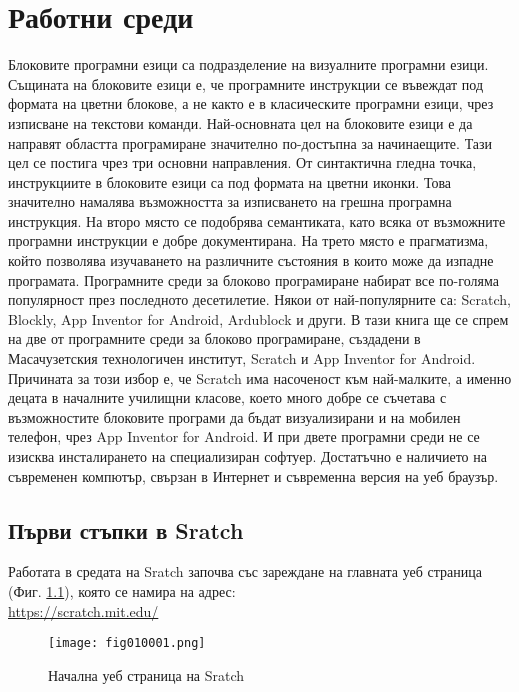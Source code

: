 \chapter{Работни среди}

Блоковите програмни езици са подразделение на визуалните програмни езици. Същината на блоковите езици е, че програмните инструкции се въвеждат под формата на цветни блокове, а не както е в класическите програмни езици, чрез изписване на текстови команди. Най-основната цел на блоковите езици е да направят областта програмиране значително по-достъпна за начинаещите. Тази цел се постига чрез три основни направления. От синтактична гледна точка, инструкциите в блоковите езици са под формата на цветни иконки. Това значително намалява възможността за изписването на грешна програмна инструкция. На второ място се подобрява семантиката, като всяка от възможните програмни инструкции е добре документирана. На трето място е прагматизма, който позволява изучаването на различните състояния в които може да изпадне програмата. Програмните среди за блоково програмиране набират все по-голяма популярност през последното десетилетие. Някои от най-популярните са: Scratch, Blockly, App Inventor for Android, Ardublock и други. В тази книга ще се спрем на две от програмните среди за блоково програмиране, създадени в Масачузетския технологичен институт, Scratch и App Inventor for Android. Причината за този избор е, че Scratch има насоченост към най-малките, а именно децата в началните училищни класове, което много добре се съчетава с възможностите блоковите програми да бъдат визуализирани и на мобилен телефон, чрез App Inventor for Android. И при двете програмни среди не се изисква инсталирането на специализиран софтуер. Достатъчно е наличието на съвременен компютър, свързан в Интернет и съвременна версия на уеб браузър. 

\section{Първи стъпки в Sratch}

Работата в средата на Sratch започва със зареждане на главната уеб страница (Фиг. \ref{fig010001}), която се намира на адрес: \\ \href{https://scratch.mit.edu/}{https://scratch.mit.edu/}

\begin{figure}[H]
  \centering
  \texttt{[image: fig010001.png]}
  \caption{Начална уеб страница на Sratch}
\label{fig010001}
\end{figure}


